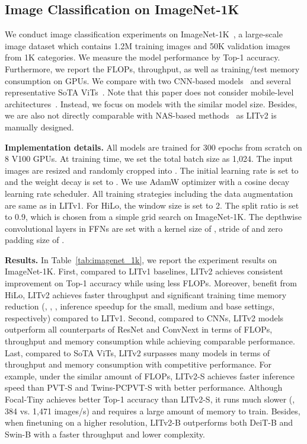 \subsection{Image Classification on ImageNet-1K} \label{sec:imagenet}
We conduct image classification experiments on ImageNet-1K~\cite{imagenet}, a large-scale image dataset which contains 1.2M training images and 50K validation images from 1K categories. We measure the model performance by Top-1 accuracy. Furthermore, we report the FLOPs, throughput, as well as training/test memory consumption on GPUs. We compare with two CNN-based models~\cite{resnet_back,convnext} and several representative SoTA ViTs~\cite{pvt,swin,cvt,yang2021focal,chu2021Twins}. Note that this paper does not consider mobile-level architectures~\cite{mobileformer,mobilevit}. Instead, we focus on models with the similar model size. Besides, we are also not directly comparable with NAS-based methods~\cite{glit,autoformer} as LITv2 is manually designed.

\textbf{Implementation details.}
All models are trained for 300 epochs from scratch on 8 V100 GPUs. At training time, we set the total batch size as 1,024. The input images are resized and randomly cropped into . The initial learning rate is set to  and the weight decay is set to . We use AdamW optimizer with a cosine decay learning rate scheduler. All training strategies including the data augmentation are same as in LITv1. For HiLo, the window size  is set to 2. The split ratio  is set to 0.9, which is chosen from a simple grid search on ImageNet-1K. The depthwise convolutional layers in FFNs are set with a kernel size of , stride of  and zero padding size of .

\textbf{Results.}
In Table~\ref{tab:imagenet_1k}, we report the experiment results on ImageNet-1K. First, compared to LITv1 baselines, LITv2 achieves consistent improvement on Top-1 accuracy while using less FLOPs. Moreover, benefit from HiLo, LITv2 achieves faster throughput and significant training time memory reduction (\eg, , ,  inference speedup for the small, medium and base settings, respectively) compared to LITv1. Second, compared to CNNs, LITv2 models outperform all counterparts of ResNet and ConvNext in terms of FLOPs, throughput and memory consumption while achieving comparable performance. Last, compared to SoTA ViTs, LITv2 surpasses many models in terms of throughput and memory consumption with competitive performance. For example, under the similar amount of FLOPs, LITv2-S achieves faster inference speed than PVT-S and Twins-PCPVT-S with better performance. Although Focal-Tiny achieves better Top-1 accuracy than LITv2-S, it runs much slower (\ie, 384 vs. 1,471 images/s) and requires a large amount of memory to train. Besides, when finetuning on a higher resolution, LITv2-B outperforms both DeiT-B and Swin-B with a faster throughput and lower complexity.


